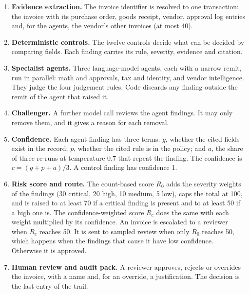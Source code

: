\documentclass[11pt,a4paper]{article}
\begin{document}
\begin{enumerate}
\item \textbf{Evidence extraction.} The invoice identifier is resolved to one transaction: the invoice with its purchase order, goods receipt, vendor, approval log entries and, for the agents, the vendor's other invoices (at most 40).
\item \textbf{Deterministic controls.} The twelve controls decide what can be decided by comparing fields. Each finding carries its rule, severity, evidence and citation.
\item \textbf{Specialist agents.} Three language-model agents, each with a narrow remit, run in parallel: math and approvals, tax and identity, and vendor intelligence. They judge the four judgement rules. Code discards any finding outside the remit of the agent that raised it.
\item \textbf{Challenger.} A further model call reviews the agent findings. It may only remove them, and it gives a reason for each removal.
\item \textbf{Confidence.} Each agent finding has three terms: $g$, whether the cited fields exist in the record; $p$, whether the cited rule is in the policy; and $a$, the share of three re-runs at temperature 0.7 that repeat the finding. The confidence is $c=(g+p+a)/3$. A control finding has confidence 1.
\item \textbf{Risk score and route.} The count-based score $R_0$ adds the severity weights of the findings (30 critical, 20 high, 10 medium, 5 low), caps the total at 100, and is raised to at least 70 if a critical finding is present and to at least 50 if a high one is. The confidence-weighted score $R_c$ does the same with each weight multiplied by its confidence. An invoice is escalated to a reviewer when $R_c$ reaches 50. It is sent to sampled review when only $R_0$ reaches 50, which happens when the findings that cause it have low confidence. Otherwise it is approved.
\item \textbf{Human review and audit pack.} A reviewer approves, rejects or overrides the invoice, with a name and, for an override, a justification. The decision is the last entry of the trail.
\end{enumerate}
\end{document}
